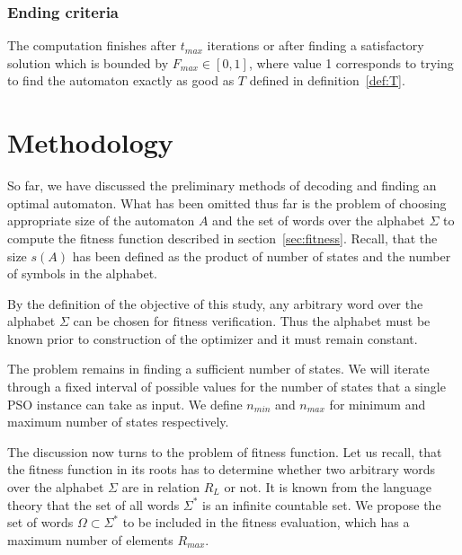 \documentclass[runningheads, a4paper]{llncs}
\begin{document}
\subsubsection{Ending criteria}
The computation finishes after $t_{max}$ iterations or after finding a satisfactory solution which is bounded by $F_{max} \in [0,1]$, where value 1 corresponds to trying to find the automaton exactly as good as $T$ defined in definition~\ref{def:T}.



\section{Methodology}\label{sec:method}

So far, we have discussed the preliminary methods of decoding and finding an optimal automaton. What has been omitted thus far is the problem of choosing appropriate size of the automaton $A$ and the set of words over the alphabet $\Sigma$ to compute the fitness function described in section~\ref{sec:fitness}. Recall, that the size $s(A)$ has been defined as the product of number of states and the number of symbols in the alphabet.

By the definition of the objective of this study, any arbitrary word over the alphabet $\Sigma$ can be chosen for fitness verification. Thus the alphabet must be known prior to construction of the optimizer and it must remain constant.

The problem remains in finding a sufficient number of states. We will iterate through a fixed interval of possible values for the number of states that a single PSO instance can take as input. We define $n_{min}$ and $n_{max}$ for minimum and maximum number of states respectively.

The discussion now turns to the problem of fitness function. Let us recall, that the fitness function in its roots has to determine whether two arbitrary  words over the alphabet $\Sigma$ are in relation $R_L$ or not. It is known from the language theory that the set of all words $\Sigma^*$ is an infinite countable set. We propose the set of words $\Omega \subset \Sigma^*$ to be included in the fitness evaluation, which has a maximum number of elements $R_{max}$.
\end{document}
